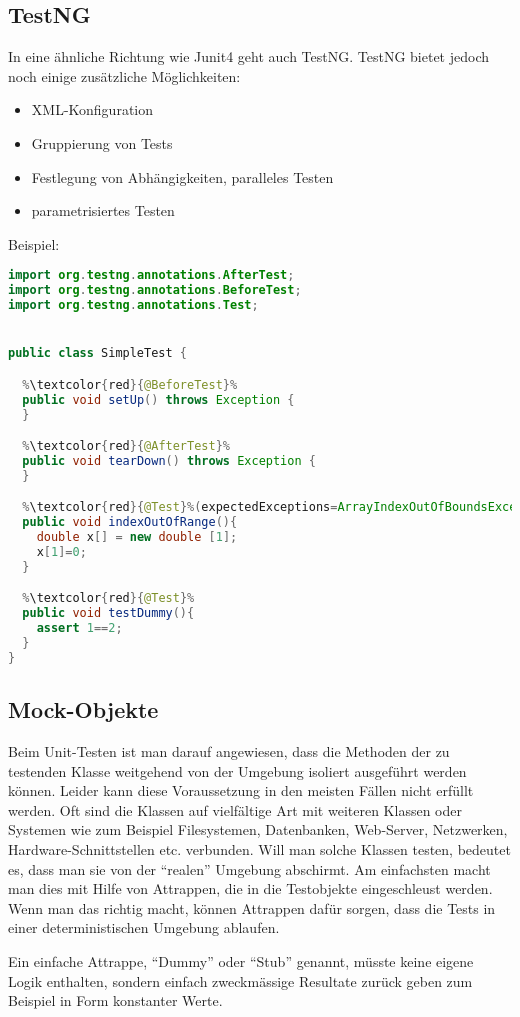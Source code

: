 \subsection{TestNG}
In eine ähnliche Richtung wie Junit4 geht auch TestNG. TestNG
 bietet jedoch noch einige zusätzliche Möglichkeiten:
\begin{itemize}
\item XML-Konfiguration
\item Gruppierung von Tests
\item Festlegung von Abhängigkeiten, paralleles Testen
\item parametrisiertes Testen
\end{itemize}
\newslide
Beispiel:
\begin{lstlisting}[language=java,escapechar=\%]
import org.testng.annotations.AfterTest;
import org.testng.annotations.BeforeTest;
import org.testng.annotations.Test;


public class SimpleTest {

  %\textcolor{red}{@BeforeTest}%
  public void setUp() throws Exception {
  }

  %\textcolor{red}{@AfterTest}%
  public void tearDown() throws Exception {
  }

  %\textcolor{red}{@Test}%(expectedExceptions=ArrayIndexOutOfBoundsException.class)
  public void indexOutOfRange(){
    double x[] = new double [1];
    x[1]=0;
  }

  %\textcolor{red}{@Test}%
  public void testDummy(){
    assert 1==2;
  }
}
\end{lstlisting}
\newslide
\subsection{Mock-Objekte}
Beim Unit-Testen ist man darauf angewiesen, dass die Methoden der zu testenden
Klasse weitgehend von der Umgebung isoliert ausgeführt werden
können. Leider kann diese Voraussetzung in den meisten Fällen nicht
erfüllt werden. Oft sind die
Klassen auf vielfältige Art mit weiteren Klassen oder Systemen wie zum
Beispiel Filesystemen, Datenbanken, Web-Server, Netzwerken,
Hardware-Schnittstellen etc. verbunden. Will man solche Klassen
testen, bedeutet es, dass man sie von der ``realen'' Umgebung
abschirmt. Am einfachsten
macht man dies mit Hilfe von Attrappen, die in die
Testobjekte eingeschleust werden. Wenn man das richtig macht, können
Attrappen dafür sorgen, dass die
Tests in einer deterministischen Umgebung ablaufen.

\newslide
Ein einfache Attrappe, ``Dummy'' oder ``Stub'' genannt, müsste keine
eigene Logik enthalten, sondern einfach zweckmässige Resultate zurück geben
zum Beispiel in Form  konstanter Werte.

